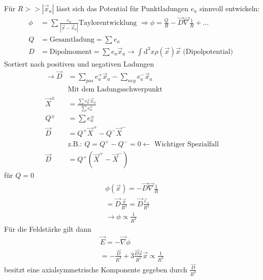 \documentclass[a4paper]{article}
\begin{document}
Für $R>>|\vec{x}_a|$ lässt sich das Potential für Punktladungen $e_a$ sinnvoll
entwickeln:
\begin{align}
\phi&=\sum\frac{e_a}{|\vec{x}-\vec{x}_a|}
\text{Taylorentwicklung } \Rightarrow \phi=\frac{Q}{R}-
\vec{D}\vec{\nabla}\frac{1}{R}+\ldots\\
Q&=\text{Gesamtladung}=\sum e_a\\
D&=\text{Dipolmoment}=\sum e_a \vec{x}_a \rightarrow \int
\mathrm{d}^3x\rho(\vec{x})\vec{x} \text{  (Dipolpotential)  }
\end{align}
Sortiert nach positiven und negativen Ladungen
\begin{align}
\rightarrow \vec{D}&=\sum_{pos} e_a^+\vec{x}_a-\sum_{neg} e_a^-\vec{x}_a\\
&\text{Mit dem Ladungsschwerpunkt}\\
\vec{X}^\pm&=\frac{\sum e^\pm_a\vec{x}_a}{\sum e^\pm_a}\\
Q^\pm&=\sum e^\pm_a\\
\vec{D}&=Q^+\vec{X}^+-Q^-\vec{X}^-\\
&\text{z.B.: }Q=Q^+-Q^-=0 \leftarrow \text{ Wichtiger Spezialfall}\\
\vec{D}&=Q^+(\vec{X}^+-\vec{X}^-)
\end{align} 
für $Q=0$
\begin{align}
\phi(\vec{x})=-\vec{D}\vec{\nabla}\frac{1}{R}\\
=\vec{D}\frac{\vec{x}}{R^3}=\vec{D}\frac{\vec{e}_x}{R^2}\\
\rightarrow \phi \propto \frac{1}{R^2}
\end{align}
Für die Feldstärke gilt dann
\begin{align}
\vec{E}=-\vec{\nabla}\phi\\
=-\frac{\vec{D}}{R^3}+3\frac{\vec{D}\vec{x}}{R^5}\vec{x}\propto \frac{1}{R^3}
\end{align}
besitzt eine axialsymmetrische Komponente gegeben durch $\frac{\vec{D}}{R^3}$
\end{document}
